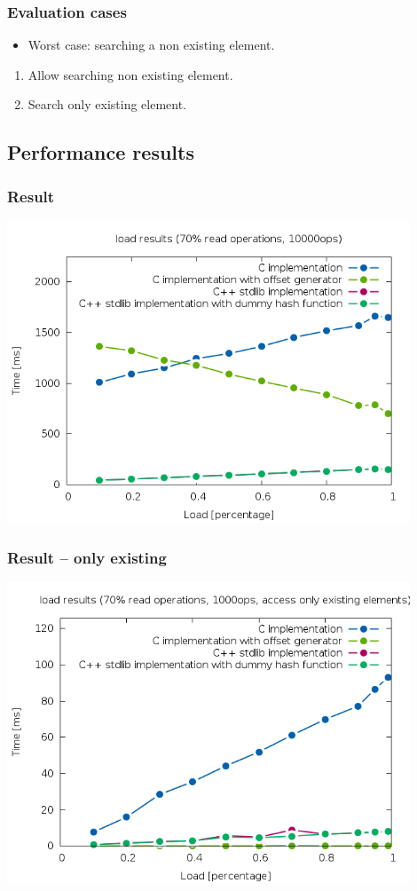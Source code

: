 \documentclass{beamer}
\begin{document}
\begin{frame}
	\frametitle{Evaluation cases}
	\begin{itemize}
		\item Worst case: searching a non existing element.
	\end{itemize}

	\begin{enumerate}
		\item Allow searching non existing element.
		\item Search only existing element.
	\end{enumerate}
\end{frame}

\subsection{Performance results}
\begin{frame}
	\frametitle{Result}
	\begin{center}
		\includegraphics[width=0.9\textwidth]{result_example_contains.png}	
	\end{center}
\end{frame}

\begin{frame}
	\frametitle{Result -- only existing}
	\begin{center}
		\includegraphics[width=0.9\textwidth]{result_example_no_contains.png}	
	\end{center}
\end{frame}
\end{document}
